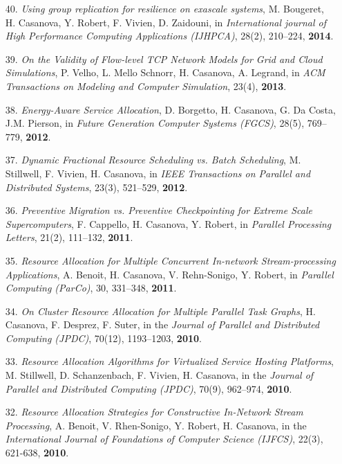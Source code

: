 \begin{enumerate}
\item[40.] {\it Using group replication for resilience on exascale systems},
M. Bougeret, H. Casanova, Y. Robert, F. Vivien, D. Zaidouni,
in \emph{International journal of High Performance Computing Applications (IJHPCA)},
28(2), 210--224, {\bf 2014}.

\item[39.] {\it On the Validity of Flow-level TCP Network Models for Grid and Cloud Simulations}, P. Velho, L. Mello Schnorr, H. Casanova, A. Legrand,
in \emph{ACM Transactions on Modeling and Computer Simulation}, 23(4),
{\bf 2013}.

\item[38.] {\it Energy-Aware Service Allocation}, D. Borgetto, H. Casanova, G. Da Costa, J.M. Pierson, in \emph{Future Generation Computer Systems (FGCS)}, 28(5), 769--779, {\bf 2012}.

\item[37.] {\it Dynamic Fractional Resource Scheduling vs. Batch Scheduling}, M. Stillwell, F. Vivien, H. Casanova, in \emph{IEEE Transactions on Parallel and Distributed Systems}, 23(3), 521--529, {\bf 2012}.

\item[36.] {\it Preventive Migration vs. Preventive Checkpointing for Extreme Scale Supercomputers}, F. Cappello, H. Casanova, Y. Robert, in \emph{Parallel Processing Letters}, 21(2), 111--132, {\bf 2011}.

\item[35.] {\it Resource Allocation for Multiple Concurrent In-network Stream-processing Applications}, A. Benoit, H. Casanova, V. Rehn-Sonigo, Y. Robert, in \emph{Parallel Computing (ParCo)}, 30, 331--348, {\bf 2011}.

\item[34.] {\it On Cluster Resource Allocation for Multiple Parallel Task Graphs}, H. Casanova, F. Desprez, F. Suter, in the \emph{Journal of Parallel and Distributed Computing (JPDC)}, 70(12), 1193--1203, {\bf 2010}.

\item[33.] {\it Resource Allocation Algorithms for Virtualized Service Hosting Platforms}, M. Stillwell, D. Schanzenbach, F. Vivien, H. Casanova, in the \emph{Journal of Parallel and Distributed Computing (JPDC)}, 70(9), 962--974, {\bf 2010}.

\item[32.] {\it Resource Allocation Strategies for Constructive In-Network Stream Processing}, A. Benoit, V. Rhen-Sonigo, Y. Robert, H. Casanova, in the \emph{International Journal of Foundations of Computer Science (IJFCS)}, 22(3), 621-638, {\bf 2010}.


\end{enumerate}
